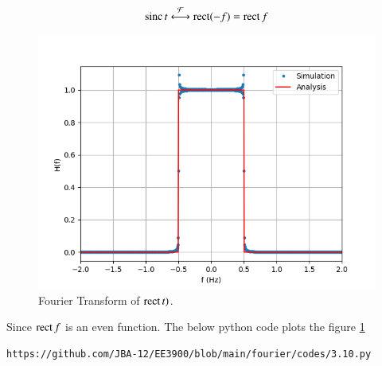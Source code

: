 \documentclass[journal,12pt,twocolumn]{IEEEtran}
\renewcommand\thesection{\arabic{section}}
\begin{document}
\begin{enumerate}[label=\thesection.\arabic*
	,ref=\thesection.\theenumi]
	\begin{align}
		\mathop{\mathrm{sinc}}{t}\overset{\mathcal{F}}{ \longleftrightarrow}\mathop{\mathrm{rect}}(-f)=\mathop{\mathrm{rect}}{f}
		\label{eq:fourier-sinc}
	\end{align}
\begin{figure}[!ht]
	\includegraphics[width=\columnwidth]{figs/3.10.png}
	\caption{Fourier Transform of $\mathop{\mathrm{rect}}{t})$.}
	\label{fig:3.10}
\end{figure}
	Since $\mathop{\mathrm{rect}}{f}$ is an even function.
	The below python code plots the figure \ref{fig:3.10}
	\begin{lstlisting}
https://github.com/JBA-12/EE3900/blob/main/fourier/codes/3.10.py
	\end{lstlisting} 
\end{enumerate}
\end{document}
